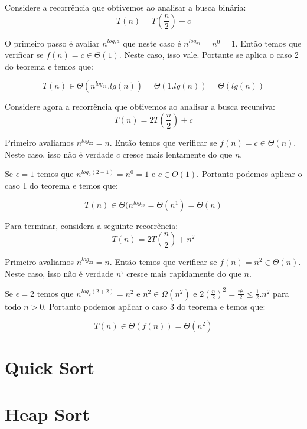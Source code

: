 \begin{example}
  Considere a recorrência que obtivemos ao analisar a busca binária:
  \begin{displaymath}
    T(n) = T\left(\frac{n}{2}\right) + c
  \end{displaymath}

  O primeiro passo é avaliar $n^{log_ba}$ que neste caso é $n^{log_21} = n^0 = 1$.
  Então temos que verificar se $f(n) = c \in \Theta(1)$.
  Neste caso, isso vale.
  Portante se aplica o caso 2 do teorema e temos que:

  \begin{displaymath}
    T(n) \in \Theta(n^{log_21}.lg(n)) = \Theta(1.lg(n)) = \Theta(lg(n))
  \end{displaymath}
\end{example}


\begin{example}
  Considere agora a recorrência que obtivemos ao analisar a busca recursiva:
  \begin{displaymath}
    T(n) = 2T\left(\frac{n}{2}\right) + c
  \end{displaymath}

  Primeiro avaliamos $n^{log_22} = n$.
  Então temos que verificar se $f(n) = c \in \Theta(n)$.
  Neste caso, isso não é verdade $c$ cresce mais lentamente do que $n$.
  
  Se  $\epsilon = 1$ temos que $n^{log_2(2-1)} = n^0 = 1$ e $c \in O(1)$.
  Portanto podemos aplicar o caso 1 do teorema e temos que:

  \begin{displaymath}
    T(n) \in \Theta(n^{log_22} = \Theta(n^1) = \Theta(n)
  \end{displaymath}
\end{example}

\begin{example}
  Para terminar, considera a seguinte recorrência:
  \begin{displaymath}
    T(n) = 2T\left(\frac{n}{2}\right) + n^2
  \end{displaymath}

  Primeiro avaliamos $n^{log_22} = n$.
  Então temos que verificar se $f(n) = n^2 \in \Theta(n)$.
  Neste caso, isso não é verdade $n²$ cresce mais rapidamente do que $n$.
  
  Se $\epsilon = 2$ temos que $n^{log_2(2+2)} = n^2$ e $n^2 \in \Omega(n^2)$ e $2(\frac{n}{2})^2 = \frac{n^2}{2} \leq \frac{1}{2}.n^2$ para todo $n > 0$.  
  Portanto podemos aplicar o caso 3 do teorema e temos que:

  \begin{displaymath}
    T(n) \in \Theta(f(n)) = \Theta(n^2)
  \end{displaymath}
\end{example}



\section{Quick Sort}
\section{Heap Sort}
